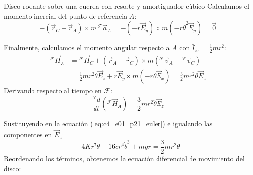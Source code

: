 \begin{solucion}{Disco rodante sobre una cuerda con resorte y amortiguador cúbico}
Calculamos el momento inercial del punto de referencia $A$:
\begin{equation}
    -(\vec{r}_C - \vec{r}_A) \times m\,{}^{\mathcal{F}}\vec{a}_A = -(-r\vec{E}_y) \times m(-r\dot{\theta}^2\vec{E}_y) = \vec{0}
\end{equation}

Finalmente, calculamos el momento angular respecto a $A$ con $\bar{I}_{zz} = \frac{1}{2}mr^2$:
\begin{align}
    {}^{\mathcal{F}}\vec{H}_A &= {}^{\mathcal{F}}\vec{H}_C + (\vec{r}_A - \vec{r}_C) \times m({}^{\mathcal{F}}\vec{v}_A - {}^{\mathcal{F}}\vec{v}_C) \nonumber \\
    &= \frac{1}{2}mr^2\dot{\theta}\vec{E}_z + r\vec{E}_y \times m(-r\dot{\theta}\vec{E}_x) = \frac{3}{2}mr^2\dot{\theta}\vec{E}_z
\end{align}
Derivando respecto al tiempo en $\mathcal{F}$:
\begin{equation}
    \frac{{}^{\mathcal{F}}d}{dt}({}^{\mathcal{F}}\vec{H}_A) = \frac{3}{2}mr^2\ddot{\theta}\vec{E}_z
\end{equation}

Sustituyendo en la ecuación (\ref{eq:c4_e01_p21_euler}) e igualando las componentes en $\vec{E}_z$:
\begin{equation}
    -4Kr^2\theta - 16cr^4\dot{\theta}^3 + mgr = \frac{3}{2}mr^2\ddot{\theta}
\end{equation}
Reordenando los términos, obtenemos la ecuación diferencial de movimiento del disco:
\end{solucion}

